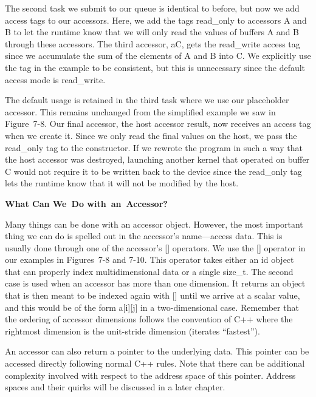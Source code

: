The second task we submit to our queue is identical to before, but now we add access tags to our accessors. Here, we add the tags read\_only to accessors A and B to let the runtime know that we will only read the values of buffers A and B through these accessors. The third accessor, aC, gets the read\_write access tag since we accumulate the sum of the elements of A and B into C. We explicitly use the tag in the example to be consistent, but this is unnecessary since the default access mode is read\_write.\par

The default usage is retained in the third task where we use our placeholder accessor. This remains unchanged from the simplified example we saw in Figure 7-8. Our final accessor, the host accessor result, now receives an access tag when we create it. Since we only read the final values on the host, we pass the read\_only tag to the constructor. If we rewrote the program in such a way that the host accessor was destroyed, launching another kernel that operated on buffer C would not require it to be written back to the device since the read\_only tag lets the runtime know that it will not be modified by the host.\par

\hspace*{\fill} \par %
\textbf{What Can We Do with an Accessor?}

Many things can be done with an accessor object. However, the most important thing we can do is spelled out in the accessor’s name—access data. This is usually done through one of the accessor’s [] operators. We use the [] operator in our examples in Figures 7-8 and 7-10. This operator takes either an id object that can properly index multidimensional data or a single size\_t. The second case is used when an accessor has more than one dimension. It returns an object that is then meant to be indexed again with [] until we arrive at a scalar value, and this would be of the form a[i][j] in a two-dimensional case. Remember that the ordering of accessor dimensions follows the convention of C++ where the rightmost dimension is the unit-stride dimension (iterates “fastest”).\par

An accessor can also return a pointer to the underlying data. This pointer can be accessed directly following normal C++ rules. Note that there can be additional complexity involved with respect to the address space of this pointer. Address spaces and their quirks will be discussed in a later chapter.\par

